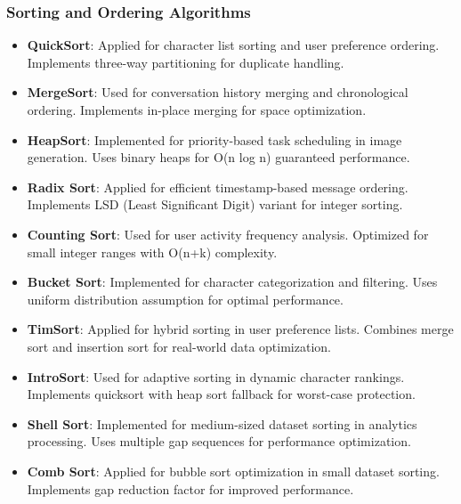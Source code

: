 \documentclass[conference]{IEEEtran}
\begin{document}
\subsubsection{Sorting and Ordering Algorithms}
\begin{itemize}
\item \textbf{QuickSort}: Applied for character list sorting and user preference ordering. Implements three-way partitioning for duplicate handling.
\item \textbf{MergeSort}: Used for conversation history merging and chronological ordering. Implements in-place merging for space optimization.
\item \textbf{HeapSort}: Implemented for priority-based task scheduling in image generation. Uses binary heaps for O(n log n) guaranteed performance.
\item \textbf{Radix Sort}: Applied for efficient timestamp-based message ordering. Implements LSD (Least Significant Digit) variant for integer sorting.
\item \textbf{Counting Sort}: Used for user activity frequency analysis. Optimized for small integer ranges with O(n+k) complexity.
\item \textbf{Bucket Sort}: Implemented for character categorization and filtering. Uses uniform distribution assumption for optimal performance.
\item \textbf{TimSort}: Applied for hybrid sorting in user preference lists. Combines merge sort and insertion sort for real-world data optimization.
\item \textbf{IntroSort}: Used for adaptive sorting in dynamic character rankings. Implements quicksort with heap sort fallback for worst-case protection.
\item \textbf{Shell Sort}: Implemented for medium-sized dataset sorting in analytics processing. Uses multiple gap sequences for performance optimization.
\item \textbf{Comb Sort}: Applied for bubble sort optimization in small dataset sorting. Implements gap reduction factor for improved performance.
\end{itemize}
\end{document}
